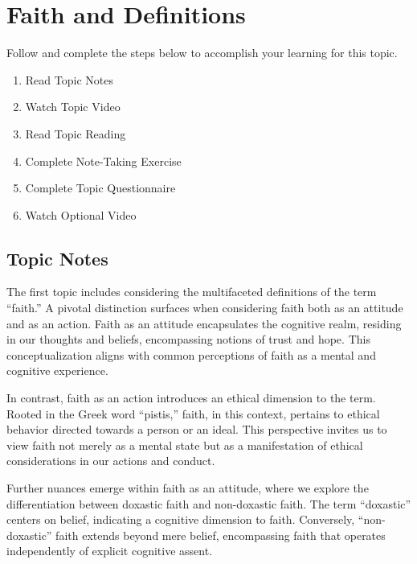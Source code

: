 \documentclass[
]{book}
\providecommand{\tightlist}{%
  \setlength{\itemsep}{0pt}\setlength{\parskip}{0pt}}
\begin{document}
\hypertarget{faith-and-definitions}{%
\section{Faith and Definitions}\label{faith-and-definitions}}

Follow and complete the steps below to accomplish your learning for this topic.

\begin{enumerate}
\def\labelenumi{\arabic{enumi}.}
\tightlist
\item
  Read Topic Notes
\item
  Watch Topic Video
\item
  Read Topic Reading
\item
  Complete Note-Taking Exercise
\item
  Complete Topic Questionnaire
\item
  Watch Optional Video
\end{enumerate}

\hypertarget{topic-notes-4}{%
\subsection*{Topic Notes}\label{topic-notes-4}}

The first topic includes considering the multifaceted definitions of the term ``faith.'' A pivotal distinction surfaces when considering faith both as an attitude and as an action. Faith as an attitude encapsulates the cognitive realm, residing in our thoughts and beliefs, encompassing notions of trust and hope. This conceptualization aligns with common perceptions of faith as a mental and cognitive experience.

In contrast, faith as an action introduces an ethical dimension to the term. Rooted in the Greek word ``pistis,'' faith, in this context, pertains to ethical behavior directed towards a person or an ideal. This perspective invites us to view faith not merely as a mental state but as a manifestation of ethical considerations in our actions and conduct.

Further nuances emerge within faith as an attitude, where we explore the differentiation between doxastic faith and non-doxastic faith. The term ``doxastic'' centers on belief, indicating a cognitive dimension to faith. Conversely, ``non-doxastic'' faith extends beyond mere belief, encompassing faith that operates independently of explicit cognitive assent.
\end{document}

